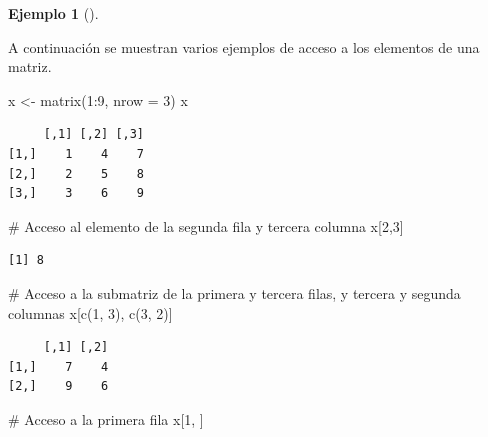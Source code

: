 \documentclass[
  a4paper,
]{scrreport}
\newenvironment{Shaded}{\begin{snugshade}}{\end{snugshade}}
\newcommand{\AttributeTok}[1]{\textcolor[rgb]{0.40,0.45,0.13}{#1}}
\newcommand{\CommentTok}[1]{\textcolor[rgb]{0.37,0.37,0.37}{#1}}
\newcommand{\DecValTok}[1]{\textcolor[rgb]{0.68,0.00,0.00}{#1}}
\newcommand{\FunctionTok}[1]{\textcolor[rgb]{0.28,0.35,0.67}{#1}}
\newcommand{\NormalTok}[1]{\textcolor[rgb]{0.00,0.23,0.31}{#1}}
\newcommand{\OtherTok}[1]{\textcolor[rgb]{0.00,0.23,0.31}{#1}}
\newcommand{\SpecialCharTok}[1]{\textcolor[rgb]{0.37,0.37,0.37}{#1}}
\theoremstyle{definition}
\newtheorem{example}{Ejemplo}[chapter]
\theoremstyle{definition}
\theoremstyle{remark}
\begin{document}
\leavevmode{}%
\begin{example}[]\label{exm-acceso-matriz}

A continuación se muestran varios ejemplos de acceso a los elementos de
una matriz.

\begin{Shaded}
\begin{Highlighting}[]
\NormalTok{x }\OtherTok{\textless{}{-}} \FunctionTok{matrix}\NormalTok{(}\DecValTok{1}\SpecialCharTok{:}\DecValTok{9}\NormalTok{, }\AttributeTok{nrow =} \DecValTok{3}\NormalTok{)}
\NormalTok{x}
\end{Highlighting}
\end{Shaded}

\begin{verbatim}
     [,1] [,2] [,3]
[1,]    1    4    7
[2,]    2    5    8
[3,]    3    6    9
\end{verbatim}

\begin{Shaded}
\begin{Highlighting}[]
\CommentTok{\# Acceso al elemento de la segunda fila y tercera columna}
\NormalTok{x[}\DecValTok{2}\NormalTok{,}\DecValTok{3}\NormalTok{]}
\end{Highlighting}
\end{Shaded}

\begin{verbatim}
[1] 8
\end{verbatim}

\begin{Shaded}
\begin{Highlighting}[]
\CommentTok{\# Acceso a la submatriz de la primera y tercera filas, y tercera y segunda columnas}
\NormalTok{x[}\FunctionTok{c}\NormalTok{(}\DecValTok{1}\NormalTok{, }\DecValTok{3}\NormalTok{), }\FunctionTok{c}\NormalTok{(}\DecValTok{3}\NormalTok{, }\DecValTok{2}\NormalTok{)]}
\end{Highlighting}
\end{Shaded}

\begin{verbatim}
     [,1] [,2]
[1,]    7    4
[2,]    9    6
\end{verbatim}

\begin{Shaded}
\begin{Highlighting}[]
\CommentTok{\# Acceso a la primera fila}
\NormalTok{x[}\DecValTok{1}\NormalTok{, ]}
\end{Highlighting}
\end{Shaded}


\end{example}
\end{document}
